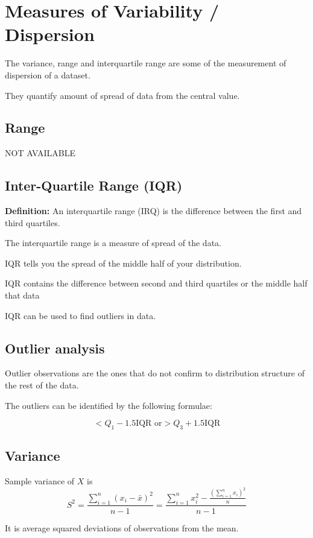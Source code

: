 \chapter{Measures of Variability / Dispersion}%
The variance, range and interquartile range are some of the measurement of dispersion of a dataset.

They quantify amount of spread of data from the central value.
\section{Range}
NOT AVAILABLE
\section{Inter-Quartile Range (IQR)}
\textbf{Definition:} An interquartile range (IRQ) is the difference between the first and third quartiles.

The interquartile range is a measure of spread of the data.

IQR tells you the spread of the middle half of your distribution.

IQR contains the {difference between} second and third quartiles  or the middle half that data

IQR can be used to find outliers in data.

\section{Outlier analysis}

Outlier observations are the ones that do not confirm to distribution structure of the rest of the data.

The outliers can be identified by the following formulae:

\begin{equation}
    < Q_1 - 1.5\text{IQR or} > Q_3 + 1.5\text{IQR}
\end{equation}
\section{Variance}
Sample variance of $X$ is
\begin{equation}
    S^2 = \frac{\sum_{i = 1}^{n}(x_i - \bar{x})^2}{n - 1} = \frac{\sum_{i = 1}^{n} x_i^2 - \frac{(\sum_{i = 1}^{n}x_i)^2}{n}}{n-1}
\end{equation}

It is average squared deviations of observations from the mean.

